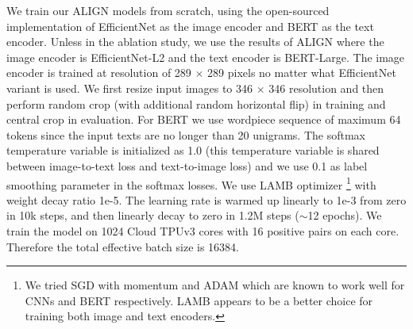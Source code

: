 \documentclass{article}
\begin{document}
We train our ALIGN models from scratch, using the open-sourced implementation of EfficientNet as the image encoder and BERT as the text encoder. Unless in the ablation study, 
we use the results of ALIGN where the image encoder is EfficientNet-L2 and the text encoder is BERT-Large.
The image encoder is trained at resolution of 289 $\times$ 289 pixels no matter what EfficientNet variant is used. We first resize input images to 346 $\times$ 346 resolution and then perform random crop (with additional random horizontal flip) in training and central crop in evaluation. For BERT we use wordpiece sequence of maximum 64 tokens since the input texts are no longer than 20 unigrams. The softmax temperature variable is initialized as 1.0 (this temperature variable is shared between image-to-text loss and text-to-image loss) and we use 0.1 as label smoothing parameter in the softmax losses. We use LAMB optimizer \cite{you:lamb}\footnote{We tried SGD with momentum and ADAM which are known to work well for CNNs and BERT respectively. LAMB appears to be a better choice for training both image and text encoders.} with weight decay ratio 1e-5. The learning rate is warmed up linearly to 1e-3 from zero in 10k steps, and then linearly decay to zero in 1.2M steps ($\sim$12 epochs). We train the model on 1024 Cloud TPUv3 cores with 16 positive pairs on each core. Therefore the total effective batch size is 16384.
\end{document}

